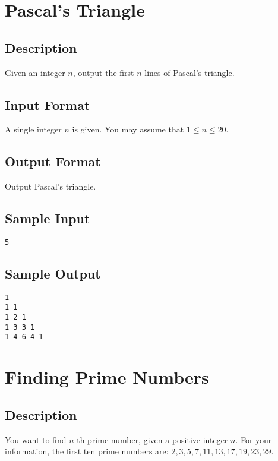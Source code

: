 

\begin{center}\end{center}
\vspace{5mm}


\section{Pascal's Triangle}

\subsection*{Description}
Given an integer $n$, output the first $n$ lines of Pascal's triangle.

\subsection*{Input Format}
A single integer $n$ is given. You may assume that $1 \leq n \leq 20$. 

\subsection*{Output Format}
Output Pascal's triangle.

\subsection*{Sample Input}
\begin{verbatim}
5
\end{verbatim}

\subsection*{Sample Output}
\begin{verbatim}
1
1 1
1 2 1
1 3 3 1
1 4 6 4 1
\end{verbatim}

\newpage


\section{Finding Prime Numbers}

\subsection*{Description}
You want to find $n$-th prime number, given a positive integer $n$. 
For your information, the first ten prime numbers are:
$2, 3, 5, 7, 11, 13, 17, 19, 23, 29$. 

